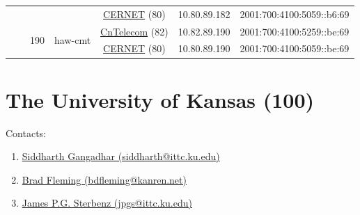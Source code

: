 \begin{small}
\begin{center}
\begin{longtable}{|c|c|c|c|c|c|c|c|}
  &  &  &  & \multicolumn{2}{|c|}{\tiny{\href{http://www.cernet.edu.cn}{CERNET} (80)}} & \tiny{10.80.89.182} & \tiny{2001:700:4100:5059::b6:69} \\* \cline{3-3}\cline{4-4}\cline{5-5}\cline{6-6}\cline{7-7}\cline{8-8}
  &  & \multirow{2}{*}{\tiny{190}} & \multicolumn{1}{|l|}{\multirow{2}{*}{\tiny{haw-cmt}}} & \multicolumn{2}{|c|}{\tiny{\href{http://www.chinatelecom.com.cn}{CnTelecom} (82)}} & \tiny{10.82.89.190} & \tiny{2001:700:4100:5259::be:69} \\* \cline{5-5}\cline{6-6}\cline{7-7}\cline{8-8}
  &  &  &  & \multicolumn{2}{|c|}{\tiny{\href{http://www.cernet.edu.cn}{CERNET} (80)}} & \tiny{10.80.89.190} & \tiny{2001:700:4100:5059::be:69} \\ \hline
\end{longtable}
\end{center}
\end{small}



\section{The University of Kansas (100)}
\label{sec:KU}

Contacts:\begin{enumerate}
 \item {}\href{mailto:siddharth@ittc.ku.edu}{Siddharth Gangadhar (siddharth@ittc.ku.edu)}
 \item {}\href{mailto:bdfleming@kanren.net}{Brad Fleming (bdfleming@kanren.net)}
 \item {}\href{mailto:jpgs@ittc.ku.edu}{James P.G. Sterbenz (jpgs@ittc.ku.edu)}
\end{enumerate}

